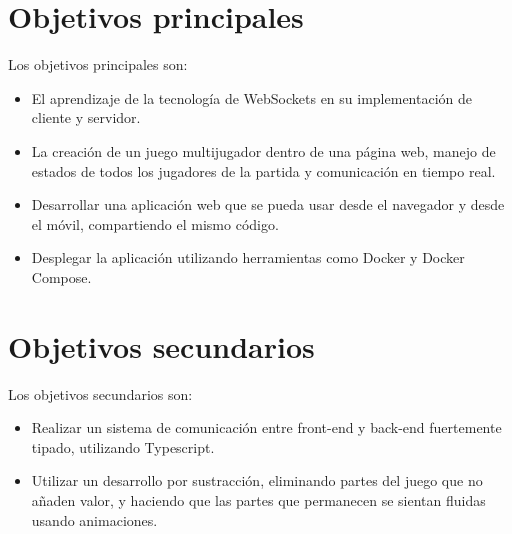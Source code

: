 \section{Objetivos principales}

Los objetivos principales son:

\begin{itemize}
	\item El aprendizaje de la tecnología de WebSockets en su implementación de cliente y servidor.
	\item La creación de un juego multijugador dentro de una página web, manejo de estados de todos los jugadores de la partida y comunicación en tiempo real.
	\item Desarrollar una aplicación web que se pueda usar desde el navegador y desde el móvil, compartiendo el mismo código.
	\item Desplegar la aplicación utilizando herramientas como Docker y Docker Compose.
\end{itemize}


\section{Objetivos secundarios}

Los objetivos secundarios son:

\begin{itemize}
	\item Realizar un sistema de comunicación entre front-end y back-end fuertemente tipado, utilizando Typescript.
	\item Utilizar un desarrollo por sustracción, eliminando partes del juego que no añaden valor, y haciendo que las partes que permanecen se sientan fluidas usando animaciones.
\end{itemize}
